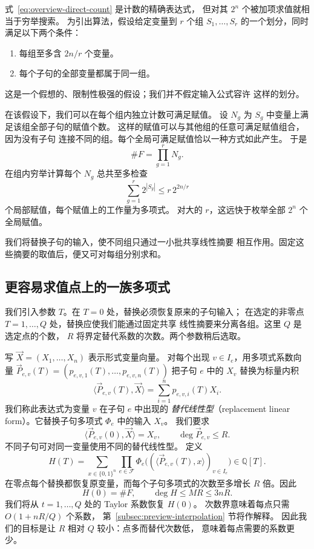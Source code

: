 式~\eqref{eq:overview-direct-count} 是计数的精确表达式，
但对其 $2^n$ 个被加项求值就相当于穷举搜索。
为引出算法，假设给定变量到 $r$ 个组 $S_1,\ldots,S_r$
的一个划分，同时满足以下两个条件：
\begin{enumerate}
\item 每组至多含 $2n/r$ 个变量。
\item 每个子句的全部变量都属于同一组。
\end{enumerate}
这是一个假想的、限制性极强的假设；我们并不假定输入公式容许
这样的划分。

在该假设下，我们可以在每个组内独立计数可满足赋值。
设 $N_g$ 为 $S_g$ 中变量上满足该组全部子句的赋值个数。
这样的赋值可以与其他组的任意可满足赋值组合，因为没有子句
连接不同的组。每个全局可满足赋值恰以一种方式如此产生。
于是
\[
 \#F=\prod_{g=1}^r N_g.
\]
在组内穷举计算每个 $N_g$ 总共至多检查
\[
 \sum_{g=1}^r 2^{|S_g|}\le r\,2^{2n/r}
\]
个局部赋值，每个赋值上的工作量为多项式。
对大的 $r$，这远快于枚举全部 $2^n$ 个全局赋值。

我们将替换子句的输入，使不同组只通过一小批共享线性摘要
相互作用。固定这些摘要的取值后，便又可对每组分别求和。

\subsection{更容易求值点上的一族多项式}
\label{subsec:preview-deformation}
我们引入参数 $T$。在 $T=0$ 处，替换必须恢复原来的子句输入；
在选定的非零点 $T=1,\ldots,Q$ 处，替换应使我们能通过固定共享
线性摘要来分离各组。这里 $Q$ 是选定点的个数，
$R$ 将界定替代系数的次数。两个参数稍后选取。

写 $\vec{X}=(X_1,\ldots,X_n)$ 表示形式变量向量。
对每个出现 $v\in I_e$，用多项式系数向量
$\vec{P}_{e,v}(T)=(p_{e,v,1}(T),\ldots,p_{e,v,n}(T))$
把子句 $e$ 中的 $X_v$ 替换为标量内积
\[
 \langle \vec{P}_{e,v}(T),\vec{X}\rangle
 =\sum_{i=1}^n p_{e,v,i}(T)X_i.
\]
我们称此表达式为变量 $v$ 在子句 $e$ 中出现的
\emph{替代线性型}（replacement linear form）。它替换子句多项式
$\Phi_e$ 中的输入 $X_v$。
我们要求
\[
 \langle \vec{P}_{e,v}(0),\vec{X}\rangle=X_v,
 \qquad \deg \vec{P}_{e,v}\le R.
\]
不同子句可对同一变量使用不同的替代线性型。
定义
\begin{equation}\label{eq:simple-counting-polynomial}
 H(T)=\sum_{x\in\{0,1\}^n}\prod_{e\in\mathcal F}
       \Phi_e\bigl((\langle \vec{P}_{e,v}(T), x\rangle)_{v\in I_e}\bigr)
       \in\mathbb Q[T].
\end{equation}
在零点每个替换都恢复原变量，而每个子句多项式的次数至多增长
$R$ 倍。因此
\begin{equation}\label{eq:overview-value-degree}
 H(0)=\#F,\qquad \deg H\le MR\le3nR.
\end{equation}
我们将从 $t=1,\ldots,Q$ 处的 Taylor 系数恢复 $H(0)$。
次数界意味着每点只需 $O(1+nR/Q)$ 个系数，
第~\ref{subsec:preview-interpolation} 节将作解释。
因此我们的目标是让 $R$ 相对 $Q$ 较小：点多而替代次数低，
意味着每点需要的系数更少。

